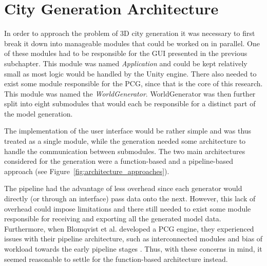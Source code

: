 \section{City Generation Architecture}
\label{sec:city-gen-arch}

In order to approach the problem of 3D city generation it was necessary to first break it down into manageable modules that could be worked on in parallel.
One of these modules had to be responsible for the GUI presented in the previous subchapter.
This module was named \textit{Application} and could be kept relatively small as most logic would be handled by the Unity engine.
There also needed to exist some module responsible for the PCG, since that is the core of this research.
This module was named the \textit{WorldGenerator}.
WorldGenerator was then further split into eight submodules that would each be responsible for a distinct part of the model generation.

The implementation of the user interface would be rather simple and was thus treated as a single module, while the generation needed some architecture to handle the communication between submodules.
The two main architectures considered for the generation were a function-based and a pipeline-based approach (see Figure~\ref{fig:architecture_approaches}).

The pipeline had the advantage of less overhead since each generator would directly (or through an interface) pass data onto the next.
However, this lack of overhead could impose limitations and there still needed to exist some module responsible for receiving and exporting all the generated model data.
Furthermore, when Blomqvist et al. developed a PCG engine, they experienced issues with their pipeline architecture, such as interconnected modules and bias of workload towards the early pipeline stages \cite[p. 45]{ba_landscape}.
Thus, with these concerns in mind, it seemed reasonable to settle for the function-based architecture instead.

